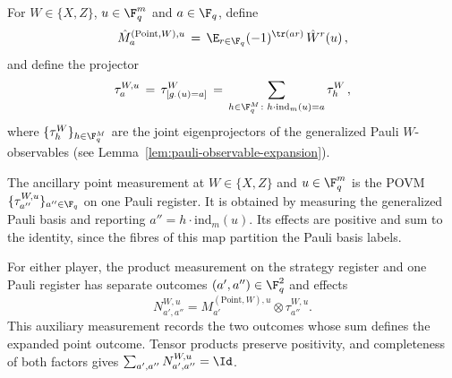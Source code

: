 \begin{definition}
	\label{def:expanded-point-measurement}
	\leanok
	For $W \in \{X,Z\}$, $u \in \F_q^m$ and $a \in \F_q$, define
	\[
		\hat{M}^{(\mathrm{Point},W),u}_a \,=\, \E_{r \in \F_q} (-1)^{\tr(ar)} \, \hat{W}^r(u)\,,
	\]
	and define the projector
	\begin{equation}\label{eq:qld-point-obs-def}
		\tau^{W,u}_a \,=\, \tau^W_{[g_\cdot(u) = a]}
		\,=\, \sum_{h \in \F_q^{M} \colon h \cdot \mathrm{ind}_m(u) = a} \tau^W_h\,,
	\end{equation}
	where $\{\tau^W_h\}_{h \in \F_q^{M}}$ are the joint eigenprojectors of
	the generalized Pauli $W$-observables
	(see Lemma~\ref{lem:pauli-observable-expansion}).
\end{definition}

\begin{definition}
	\label{def:ancillary-point-measurement}
	\leanok
	The ancillary point measurement at $W\in\{X,Z\}$ and $u\in\F_q^m$
	is the POVM $\{\tau^{W,u}_{a''}\}_{a''\in\F_q}$ on one Pauli
	register. It is obtained by measuring the generalized Pauli basis
	and reporting $a''=h\cdot\mathrm{ind}_m(u)$. Its effects are
	positive and sum to the identity, since the fibres of this map
	partition the Pauli basis labels.
\end{definition}

\begin{definition}
	\label{def:point-tau-measurement}
	\leanok
	For either player, the product measurement on the strategy register
	and one Pauli register has separate outcomes $(a',a'')\in\F_q^2$
	and effects
	\[
	N^{W,u}_{a',a''}
	=M^{(\mathrm{Point},W),u}_{a'}\otimes\tau^{W,u}_{a''}.
	\]
	This auxiliary measurement records the two outcomes whose sum defines
	the expanded point outcome. Tensor products preserve positivity, and
	completeness of both factors gives $\sum_{a',a''}N^{W,u}_{a',a''}=\Id$.
\end{definition}

